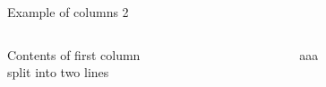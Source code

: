 \documentclass{beamer}
\begin{document}
\begin{frame}[fragile]{Example of columns 2}
	\begin{columns}[T] %
		\begin{column}[T]{5cm} %
			Contents of first column \\ split into two lines
		\end{column}
		\begin{column}[T]{5cm} %
aaa
		\end{column}
	\end{columns}
\end{frame}
\end{document}
